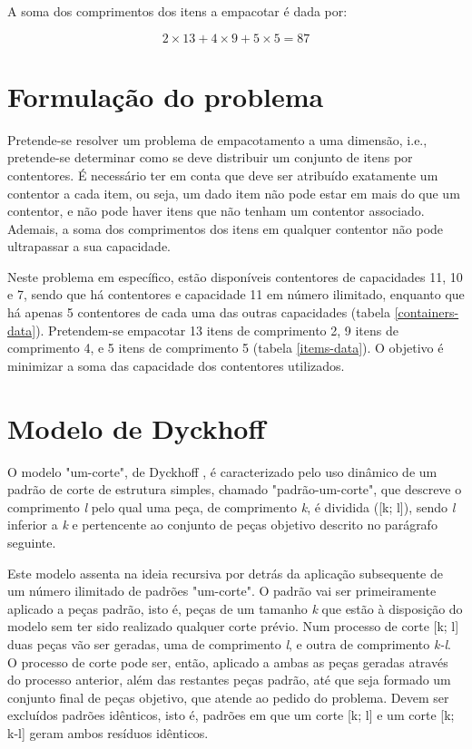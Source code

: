 \documentclass[12pt, a4paper, titlepage]{article}
\begin{document}
A soma dos comprimentos dos itens a empacotar é dada por:

$$2 \times 13 + 4 \times 9 + 5 \times 5 = 87$$

\section{Formulação do problema}

Pretende-se resolver um problema de empacotamento a uma dimensão, i.e., pretende-se determinar como
se deve distribuir um conjunto de itens por contentores. É necessário ter em conta que deve ser
atribuído exatamente um contentor a cada item, ou seja, um dado item não pode estar em mais do que
um contentor, e não pode haver itens que não tenham um contentor associado. Ademais, a soma dos
comprimentos dos itens em qualquer contentor não pode ultrapassar a sua capacidade.

Neste problema em específico, estão disponíveis contentores de capacidades 11, 10 e 7, sendo que há
contentores e capacidade 11 em número ilimitado, enquanto que há apenas 5 contentores de cada uma
das outras capacidades (tabela \ref{containers-data}). Pretendem-se empacotar 13 itens de
comprimento 2, 9 itens de comprimento 4, e 5 itens de comprimento 5 (tabela \ref{items-data}). O
objetivo é minimizar a soma das capacidade dos contentores utilizados.

\section{Modelo de Dyckhoff}

O modelo "um-corte", de Dyckhoff \cite{dyckhoff}, é caracterizado pelo uso dinâmico de um padrão de
corte de estrutura simples, chamado "padrão-um-corte", que descreve o comprimento \textit{l} pelo
qual uma peça, de comprimento \textit{k}, é dividida ([k; l]), sendo \textit{l} inferior a
\textit{k} e pertencente ao conjunto de peças objetivo descrito no parágrafo seguinte.

Este modelo assenta na ideia recursiva por detrás da aplicação subsequente de um número ilimitado de
padrões "um-corte". O padrão vai ser primeiramente aplicado a peças padrão, isto é, peças de um
tamanho \textit{k} que estão à disposição do modelo sem ter sido realizado qualquer corte prévio.
Num processo de corte [k; l] duas peças vão ser geradas, uma de comprimento \textit{l}, e outra de
comprimento \textit{k-l}. O processo de corte pode ser, então, aplicado a ambas as peças geradas
através do processo anterior, além das restantes peças padrão, até que seja formado um conjunto
final de peças objetivo, que atende ao pedido do problema. Devem ser excluídos padrões idênticos,
isto é, padrões em que um corte [k; l] e um corte [k; k-l] geram ambos resíduos idênticos.
\end{document}
